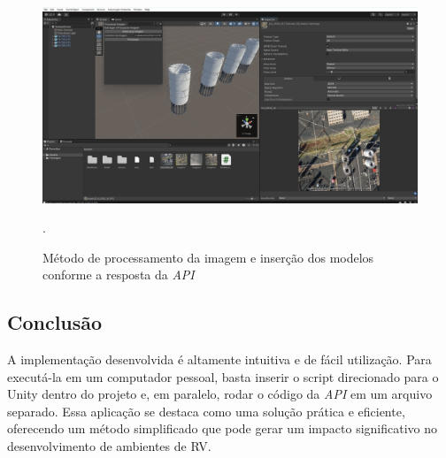 \begin{figure}[!h]
    \centering
    \begin{minipage}{0.9\linewidth}
    \centering
    \captionsetup{justification=centering,margin=0.5cm,font=small}
    \includegraphics[width=1\linewidth]{img/cap5/predict.jpeg}
    \caption{Método de processamento da imagem e inserção dos modelos conforme a resposta da \textit{API}}.
    \label{fig:predict}
    \end{minipage}
\end{figure}

\subsection{Conclusão}

A implementação desenvolvida é altamente intuitiva e de fácil utilização. Para executá-la em um computador pessoal, basta inserir o script direcionado para o Unity dentro do projeto e, em paralelo, rodar o código da \textit{API} em um arquivo separado. Essa aplicação se destaca como uma solução prática e eficiente, oferecendo um método simplificado que pode gerar um impacto significativo no desenvolvimento de ambientes de RV.


	










